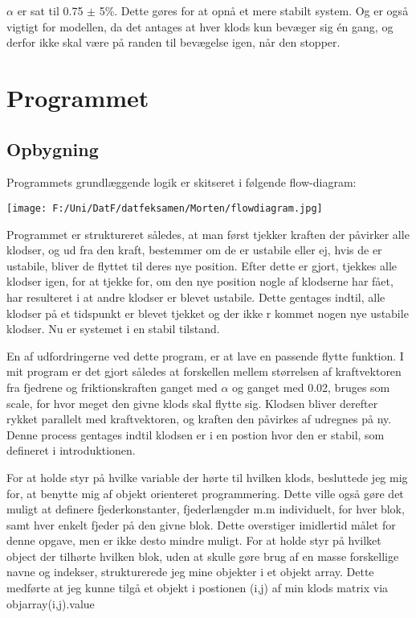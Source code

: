 \documentclass[12pt]{article}
\begin{document}
 $\alpha$ er sat til 0.75 $\pm$ 5\%. Dette gøres for at opnå et mere stabilt system. Og er også vigtigt for modellen, da det antages at hver klods kun bevæger sig én gang, og derfor ikke skal være på randen til bevægelse igen, når den stopper.

\newpage

\section{Programmet}
 
\subsection{Opbygning}
Programmets grundlæggende logik er skitseret i følgende flow-diagram:

\texttt{[image: F:/Uni/DatF/datfeksamen/Morten/flowdiagram.jpg]}

\newpage

Programmet er struktureret således, at man først tjekker kraften der påvirker alle klodser, og ud fra den kraft, bestemmer om de er ustabile eller ej, hvis de er ustabile, bliver de flyttet til deres nye position. Efter dette er gjort, tjekkes alle klodser igen, for at tjekke for, om den nye position nogle af klodserne har fået, har resulteret i at andre klodser er blevet ustabile. Dette gentages indtil, alle klodser på et tidspunkt er blevet tjekket og der ikke r kommet nogen nye ustabile klodser. Nu er systemet i en stabil tilstand.

En af udfordringerne ved dette program, er at lave en passende flytte funktion. I mit program er det gjort således at forskellen mellem størrelsen af kraftvektoren fra fjedrene og friktionskraften ganget med $\alpha$ og ganget med 0.02, bruges som scale, for hvor meget den givne klods skal flytte sig. Klodsen bliver derefter rykket parallelt med kraftvektoren, og kraften den påvirkes af udregnes på ny. Denne process gentages indtil klodsen er i en postion hvor den er stabil, som defineret i introduktionen.

For at holde styr på hvilke variable der hørte til hvilken klods, besluttede jeg mig for, at benytte mig af objekt orienteret programmering. Dette ville også gøre det muligt at definere fjederkonstanter, fjederlængder m.m individuelt, for hver blok, samt hver enkelt fjeder på den givne blok. Dette overstiger imidlertid målet for denne opgave, men er ikke desto mindre muligt.
For at holde styr på hvilket object der tilhørte hvilken blok, uden at skulle gøre brug af en masse forskellige navne og indekser, strukturerede jeg mine objekter i et objekt array. Dette medførte at jeg kunne tilgå et objekt i postionen (i,j) af min klods matrix via objarray(i,j).value
\end{document}
